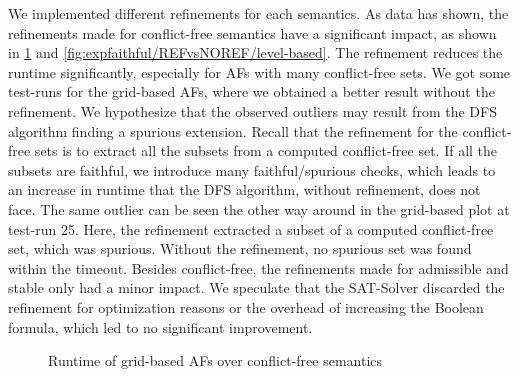 We implemented different refinements for each semantics. As data has shown, the refinements made for conflict-free semantics have a significant impact, as shown in \cref{fig:expfaithful/REFvsNOREF/grid-based} and \cref{fig:expfaithful/REFvsNOREF/level-based}. The refinement reduces the runtime significantly, especially for AFs with many conflict-free sets. We got some test-runs for the grid-based AFs, where we obtained a better result without the refinement. We hypothesize that the observed outliers may result from the DFS algorithm finding a spurious extension. Recall that the refinement for the conflict-free sets is to extract all the subsets from a computed conflict-free set. If all the subsets are faithful, we introduce many faithful/spurious checks, which leads to an increase in runtime that the DFS algorithm, without refinement, does not face. The same outlier can be seen the other way around in the grid-based plot at test-run 25. Here, the refinement extracted a subset of a computed conflict-free set, which was spurious. Without the refinement, no spurious set was found within the timeout. Besides conflict-free, the refinements made for admissible and stable only had a minor impact. We speculate that the SAT-Solver discarded the refinement for optimization reasons or the overhead of increasing the Boolean formula, which led to no significant improvement.


\begin{figure}[H]
    \centering
    \caption{Runtime of grid-based AFs over conflict-free semantics}
    \label{fig:expfaithful/REFvsNOREF/grid-based}
\end{figure}

